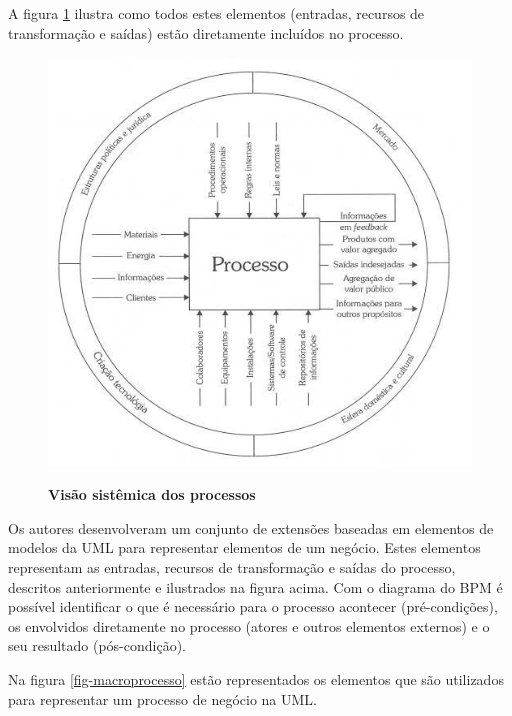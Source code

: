 \documentclass[
	12pt,				%
	openright,			%
	oneside,			%
	a4paper,			%
	chapter=TITLE,		%
	section=TITLE,		%
	english,			%
	french,				%
	spanish,			%
	brazil				%
	]{abntex2}
\begin{document}
A figura \ref{fig-processo} ilustra como todos estes elementos (entradas, recursos de transformação e saídas) estão diretamente incluídos no processo.
\\

\begin{figure}[htb]
	\begin{center}
		\caption{
			\textbf{Visão sistêmica dos processos}
		}\label{fig-processo}
		\includegraphics [scale=0.9]{imagens/processo.jpg}
		\label{fig-processo}
	\end{center}
\end{figure}

Os autores  desenvolveram um conjunto de extensões baseadas em elementos de modelos da UML para representar elementos de um negócio. Estes elementos representam as entradas, recursos de transformação e saídas do processo, descritos anteriormente e ilustrados na figura acima. Com o diagrama do BPM é possível identificar o que é necessário para o processo acontecer (pré-condições), os envolvidos diretamente no processo (atores e outros elementos externos) e o seu resultado (pós-condição).

Na figura \ref{fig-macroprocesso} estão representados os elementos que são utilizados para representar um processo de negócio na UML.
\\ \\ \\
\end{document}
